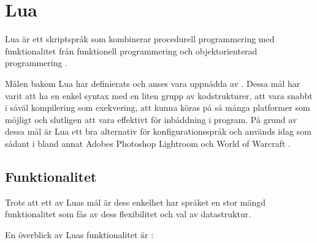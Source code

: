 
\section{Lua}

Lua är ett skriptspråk som kombinerar procedurell programmering med
funktionalitet från funktionell programmering och objektorienterad
programmering \citep{luaimp}.

Målen bakom Lua har definierats och anses vara uppnådda av \cite{luaimp}.
Dessa mål har varit att ha en enkel syntax med en liten grupp av
kodstrukturer, att vara snabbt i såväl kompilering som exekvering, att kunna
köras på så många platformer som möjligt och slutligen att vara effektivt för
inbäddning i program. På grund av dessa mål är Lua ett bra alternativ för
konfigurationsspråk och används idag som sådant i bland annat Adobes Photoshop
Lightroom och World of Warcraft \citep{lua}.

\subsection{Funktionalitet}

Trots att ett av Luas mål är dess enkelhet har språket en stor mängd
funktionalitet som fås av dess flexibilitet och val av datastruktur.

En överblick av Luas funktionalitet är \citep{luaimp}:

